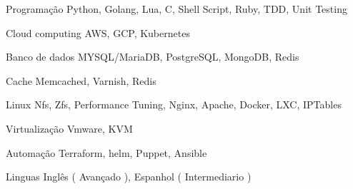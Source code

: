 

\begin{cvskills}

  \cvskill
    {Programação} %
    {Python, Golang, Lua, C, Shell Script, Ruby, TDD, Unit Testing} %

  \cvskill
    {Cloud computing} %
    {AWS, GCP, Kubernetes} %

  \cvskill
    {Banco de dados} %
    {MYSQL/MariaDB, PostgreSQL, MongoDB, Redis} %

  \cvskill
    {Cache} %
    {Memcached, Varnish, Redis} %

  \cvskill
    {Linux} %
    {Nfs, Zfs, Performance Tuning, Nginx, Apache, Docker, LXC, IPTables } %

\cvskill
    {Virtualização} %
    {Vmware, KVM} %

\cvskill
  {Automação} %
  {Terraform, helm, Puppet, Ansible} %

\cvskill
  {Linguas} %
  {Inglês ( Avançado ), Espanhol ( Intermediario )} %

\end{cvskills}

